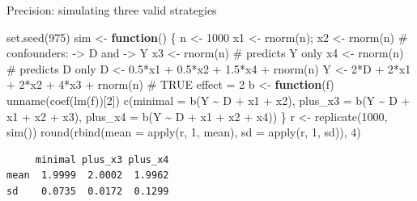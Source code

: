 \documentclass[
  11pt,
  ignorenonframetext,
  aspectratio=169,
]{beamer}
\newenvironment{Shaded}{\begin{snugshade}}{\end{snugshade}}
\newcommand{\AttributeTok}[1]{\textcolor[rgb]{0.40,0.45,0.13}{#1}}
\newcommand{\CommentTok}[1]{\textcolor[rgb]{0.37,0.37,0.37}{#1}}
\newcommand{\ControlFlowTok}[1]{\textcolor[rgb]{0.00,0.23,0.31}{\textbf{#1}}}
\newcommand{\DecValTok}[1]{\textcolor[rgb]{0.68,0.00,0.00}{#1}}
\newcommand{\FloatTok}[1]{\textcolor[rgb]{0.68,0.00,0.00}{#1}}
\newcommand{\FunctionTok}[1]{\textcolor[rgb]{0.28,0.35,0.67}{#1}}
\newcommand{\NormalTok}[1]{\textcolor[rgb]{0.00,0.23,0.31}{#1}}
\newcommand{\OtherTok}[1]{\textcolor[rgb]{0.00,0.23,0.31}{#1}}
\newcommand{\SpecialCharTok}[1]{\textcolor[rgb]{0.37,0.37,0.37}{#1}}
\begin{document}
\begin{frame}[fragile]{Precision: simulating three valid strategies}
\protect{}\label{precision-simulating-three-valid-strategies}
\begin{Shaded}
\begin{Highlighting}[]
\FunctionTok{set.seed}\NormalTok{(}\DecValTok{975}\NormalTok{)}
\NormalTok{sim }\OtherTok{\textless{}{-}} \ControlFlowTok{function}\NormalTok{() \{}
\NormalTok{  n  }\OtherTok{\textless{}{-}} \DecValTok{1000}
\NormalTok{  x1 }\OtherTok{\textless{}{-}} \FunctionTok{rnorm}\NormalTok{(n); x2 }\OtherTok{\textless{}{-}} \FunctionTok{rnorm}\NormalTok{(n)                 }\CommentTok{\# confounders: {-}\textgreater{} D and {-}\textgreater{} Y}
\NormalTok{  x3 }\OtherTok{\textless{}{-}} \FunctionTok{rnorm}\NormalTok{(n)                                 }\CommentTok{\# predicts Y only}
\NormalTok{  x4 }\OtherTok{\textless{}{-}} \FunctionTok{rnorm}\NormalTok{(n)                                 }\CommentTok{\# predicts D only}
\NormalTok{  D  }\OtherTok{\textless{}{-}} \FloatTok{0.5}\SpecialCharTok{*}\NormalTok{x1 }\SpecialCharTok{+} \FloatTok{0.5}\SpecialCharTok{*}\NormalTok{x2 }\SpecialCharTok{+} \FloatTok{1.5}\SpecialCharTok{*}\NormalTok{x4 }\SpecialCharTok{+} \FunctionTok{rnorm}\NormalTok{(n)}
\NormalTok{  Y  }\OtherTok{\textless{}{-}} \DecValTok{2}\SpecialCharTok{*}\NormalTok{D }\SpecialCharTok{+} \DecValTok{2}\SpecialCharTok{*}\NormalTok{x1 }\SpecialCharTok{+} \DecValTok{2}\SpecialCharTok{*}\NormalTok{x2 }\SpecialCharTok{+} \DecValTok{4}\SpecialCharTok{*}\NormalTok{x3 }\SpecialCharTok{+} \FunctionTok{rnorm}\NormalTok{(n)      }\CommentTok{\# TRUE effect = 2}
\NormalTok{  b  }\OtherTok{\textless{}{-}} \ControlFlowTok{function}\NormalTok{(f) }\FunctionTok{unname}\NormalTok{(}\FunctionTok{coef}\NormalTok{(}\FunctionTok{lm}\NormalTok{(f))[}\DecValTok{2}\NormalTok{])}
  \FunctionTok{c}\NormalTok{(}\AttributeTok{minimal =} \FunctionTok{b}\NormalTok{(Y }\SpecialCharTok{\textasciitilde{}}\NormalTok{ D }\SpecialCharTok{+}\NormalTok{ x1 }\SpecialCharTok{+}\NormalTok{ x2),}
    \AttributeTok{plus\_x3 =} \FunctionTok{b}\NormalTok{(Y }\SpecialCharTok{\textasciitilde{}}\NormalTok{ D }\SpecialCharTok{+}\NormalTok{ x1 }\SpecialCharTok{+}\NormalTok{ x2 }\SpecialCharTok{+}\NormalTok{ x3),}
    \AttributeTok{plus\_x4 =} \FunctionTok{b}\NormalTok{(Y }\SpecialCharTok{\textasciitilde{}}\NormalTok{ D }\SpecialCharTok{+}\NormalTok{ x1 }\SpecialCharTok{+}\NormalTok{ x2 }\SpecialCharTok{+}\NormalTok{ x4))}
\NormalTok{\}}
\NormalTok{r }\OtherTok{\textless{}{-}} \FunctionTok{replicate}\NormalTok{(}\DecValTok{1000}\NormalTok{, }\FunctionTok{sim}\NormalTok{())}
\FunctionTok{round}\NormalTok{(}\FunctionTok{rbind}\NormalTok{(}\AttributeTok{mean =} \FunctionTok{apply}\NormalTok{(r, }\DecValTok{1}\NormalTok{, mean), }\AttributeTok{sd =} \FunctionTok{apply}\NormalTok{(r, }\DecValTok{1}\NormalTok{, sd)), }\DecValTok{4}\NormalTok{)}
\end{Highlighting}
\end{Shaded}

\begin{verbatim}
     minimal plus_x3 plus_x4
mean  1.9999  2.0002  1.9962
sd    0.0735  0.0172  0.1299
\end{verbatim}
\end{frame}
\end{document}
